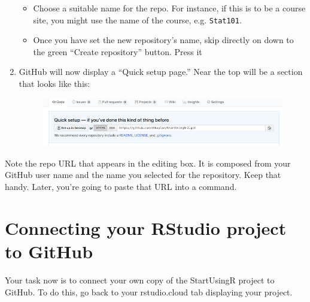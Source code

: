 \documentclass[]{book}
\providecommand{\tightlist}{%
  \setlength{\itemsep}{0pt}\setlength{\parskip}{0pt}}
\theoremstyle{definition}
\theoremstyle{definition}
\theoremstyle{definition}
\theoremstyle{remark}
\begin{document}
\begin{enumerate}
  \begin{itemize}
  \tightlist
  \item
    Choose a suitable name for the repo. For instance, if this is to be
    a course site, you might use the name of the course, e.g.
    \texttt{Stat101}.
  \item
    Once you have set the new repository's name, skip directly on down
    to the green ``Create repository'' button. Press it
  \end{itemize}
\item
  GitHub will now display a ``Quick setup page.'' Near the top will be a
  section that looks like this:

  \begin{figure}
  \centering
  \includegraphics{images/new_repo3.png}
  \caption{}
  \end{figure}
\end{enumerate}

Note the repo URL that appears in the editing box. It is composed from
your GitHub user name and the name you selected for the repository. Keep
that handy. Later, you're going to paste that URL into a command.

\section{Connecting your RStudio project to
GitHub}\label{connecting-your-rstudio-project-to-github}

Your task now is to connect your own copy of the StartUsingR project to
GitHub. To do this, go back to your rstudio.cloud tab displaying your
project.
\end{document}

